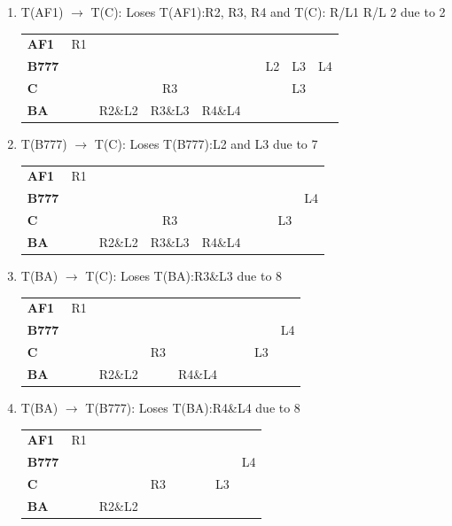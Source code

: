 \documentclass[12pt]{article}
\begin{document}
\begin{enumerate}
\begin{enumerate}
\item T(AF1) $\rightarrow$ T(C): Loses T(AF1):R2, R3, R4 and T(C): R/L1 R/L 2 due to 2

\begin{center}\begin{tabular}{l|cccccccc|}
{\bf AF1}  & R1 & & & & & & & \\ 
{\bf B777} &  &  &  &  & & L2 & L3 & L4 \\ 
{\bf C}    &  & & R3 & & & & L3 & \\ 
{\bf BA}   & & R2\&L2 & R3\&L3 & R4\&L4 &  &  &  &  \\ 
\end{tabular}\end{center}

\item T(B777) $\rightarrow$ T(C): Loses T(B777):L2 and L3 due to 7

\begin{center}\begin{tabular}{l|cccccccc|}
{\bf AF1}  & R1 & & & & & & & \\ 
{\bf B777} &  &  &  &  & & & & L4 \\ 
{\bf C}    &  & & R3 & & & & L3 & \\ 
{\bf BA}   & & R2\&L2 & R3\&L3 & R4\&L4 &  &  &  &  \\ 
\end{tabular}\end{center}

\item T(BA) $\rightarrow$ T(C): Loses T(BA):R3\&L3 due to 8

\begin{center}\begin{tabular}{l|cccccccc|}
{\bf AF1}  & R1 & & & & & & & \\ 
{\bf B777} &  &  &  &  & & & & L4 \\ 
{\bf C}    &  & & R3 & & & & L3 & \\ 
{\bf BA}   & & R2\&L2 & & R4\&L4 &  &  &  &  \\ 
\end{tabular}\end{center}

\item T(BA) $\rightarrow$ T(B777): Loses T(BA):R4\&L4 due to 8
\begin{center}\begin{tabular}{l|cccccccc|}
{\bf AF1}  & R1 & & & & & & & \\ 
{\bf B777} &  &  &  &  &  &  &  & L4 \\ 
{\bf C}    & & & R3 &  & & & L3 &  \\ 
{\bf BA}   &  & R2\&L2 &  &  &  &  &  &  \\
\end{tabular}\end{center}
\end{enumerate}


\end{enumerate}
\end{document}

